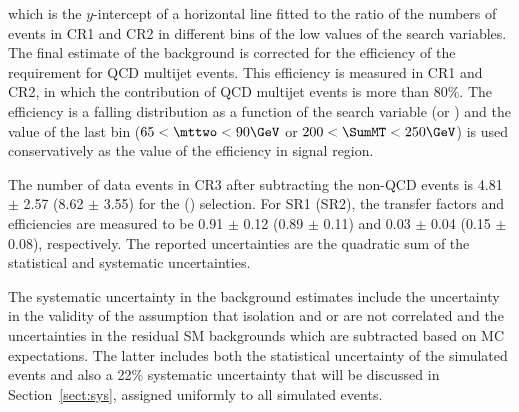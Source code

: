 which is the $y$-intercept of a horizontal line fitted to the ratio of the numbers of events in CR1 and CR2 in different bins of the low values of the search variables.
The final estimate of the background 
is corrected for the efficiency of 
the \deltaphi requirement for QCD multijet events. This efficiency is measured in CR1 and CR2, 
in which the contribution of QCD multijet events is more than $80\%$. The efficiency is a falling distribution as a function of 
the search variable (\mttwo or \SumMT)
and the value of the last bin ($65<\mttwo<90\GeV$ or $200<\SumMT<250\GeV$) is used conservatively as the 
value of the efficiency in signal region.

The number of data events in CR3 after subtracting the non-QCD events is 4.81 $\pm$ 2.57 (8.62 $\pm$ 3.55) for the \binone (\bintwo) selection.
For SR1 (SR2), the transfer factors and  \deltaphi efficiencies are measured to be 0.91 $\pm$ 0.12 (0.89 $\pm$ 0.11) and 0.03 $\pm$ 0.04 (0.15 $\pm$ 0.08), 
respectively.
The reported uncertainties are the quadratic sum of the statistical and systematic uncertainties.


The systematic uncertainty in the background estimates include the uncertainty in the validity of the assumption that isolation and \mttwo or \SumMT are not correlated and the uncertainties in the residual 
SM backgrounds which  are subtracted based on MC expectations. 
The latter includes both the statistical uncertainty of the simulated 
events and also a 22\% systematic uncertainty that will be discussed in Section~\ref{sect:sys}, 
assigned uniformly to all simulated events.

